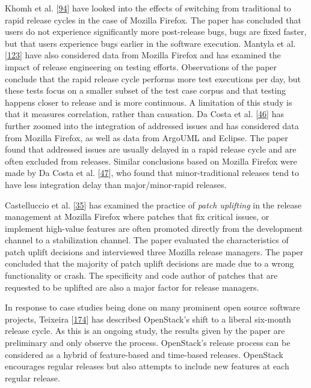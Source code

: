 \documentclass[]{book}
\begin{document}
Khomh et al. {[}\protect\hyperlink{ref-khomh2015a}{94}{]} have looked
into the effects of switching from traditional to rapid release cycles
in the case of Mozilla Firefox. The paper has concluded that users do
not experience significantly more post-release bugs, bugs are fixed
faster, but that users experience bugs earlier in the software
execution. Mantyla et al.
{[}\protect\hyperlink{ref-mantyla2015a}{123}{]} have also considered
data from Mozilla Firefox and has examined the impact of release
engineering on testing efforts. Observations of the paper conclude that
the rapid release cycle performs more test executions per day, but these
tests focus on a smaller subset of the test case corpus and that testing
happens closer to release and is more continuous. A limitation of this
study is that it measures correlation, rather than causation. Da Costa
et al. {[}\protect\hyperlink{ref-da2014a}{46}{]} has further zoomed into
the integration of addressed issues and has considered data from Mozilla
Firefox, as well as data from ArgoUML and Eclipse. The paper found that
addressed issues are usually delayed in a rapid release cycle and are
often excluded from releases. Similar conclusions based on Mozilla
Firefox were made by Da Costa et al.
{[}\protect\hyperlink{ref-da2016a}{47}{]}, who found that
minor-traditional releases tend to have less integration delay than
major/minor-rapid releases.

Castelluccio et al. {[}\protect\hyperlink{ref-castelluccio2017a}{35}{]}
has examined the practice of \emph{patch uplifting} in the release
management at Mozilla Firefox where patches that fix critical issues, or
implement high-value features are often promoted directly from the
development channel to a stabilization channel. The paper evaluated the
characteristics of patch uplift decisions and interviewed three Mozilla
release managers. The paper concluded that the majority of patch uplift
decisions are made due to a wrong functionality or crash. The
specificity and code author of patches that are requested to be uplifted
are also a major factor for release managers.

In response to case studies being done on many prominent open source
software projects, Teixeira
{[}\protect\hyperlink{ref-teixeira2017a}{174}{]} has described
OpenStack's shift to a liberal six-month release cycle. As this is an
ongoing study, the results given by the paper are preliminary and only
observe the process. OpenStack's release process can be considered as a
hybrid of feature-based and time-based releases. OpenStack encourages
regular releases but also attempts to include new features at each
regular release.
\end{document}
